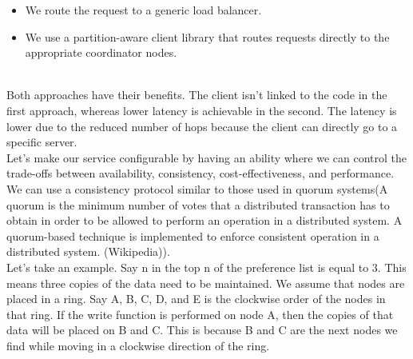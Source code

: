 \begin{itemize}
\item
\protect{}\label{Zlj5Uo6DLRXkmcGiO_waT}
We route the request to a generic load balancer.
\item
\protect{}\label{vuP8kuSxDK77kkbEkwIFH}
We use a partition-aware client library that routes requests directly to the appropriate coordinator nodes.
\end{itemize}
\\
Both approaches have their benefits. The client isn't linked to the code in the first approach, whereas lower latency is achievable in the second. The latency is lower due to the reduced number of hops because the client can directly go to a specific server.
\\
Let's make our service configurable by having an ability where we can control the trade-offs between availability, consistency, cost-effectiveness, and performance. We can use a consistency protocol similar to those used in quorum systems(A quorum is the minimum number of votes that a distributed transaction has to obtain in order to be allowed to perform an operation in a distributed system. A quorum-based technique is implemented to enforce consistent operation in a distributed system. (Wikipedia)).
\\
Let's take an example. Say
\protect{}\label{katex_inline_K_c9aEHTcTKxcx8RuKlV1}{{{\(\text{n}\)}}} in the top \protect{}\label{katex_inline_Ql_FEZKhUBiCHkyrv4fbV}{{{\(\text{n}\)}}} of the preference list is equal to \protect{}\label{katex_inline_D-xVdWdZ_LoRTC32uFuG6}{{{\(\text{3}\)}}}. This means three copies of the data need to be maintained. We assume that nodes are placed in a ring. Say
A, B, C, D, and E is the clockwise order of the nodes in that ring. If the write function is performed on node A, then the copies of that data will be placed on B and C. This is because B and C are the next nodes we find while moving in a clockwise direction of the ring.

